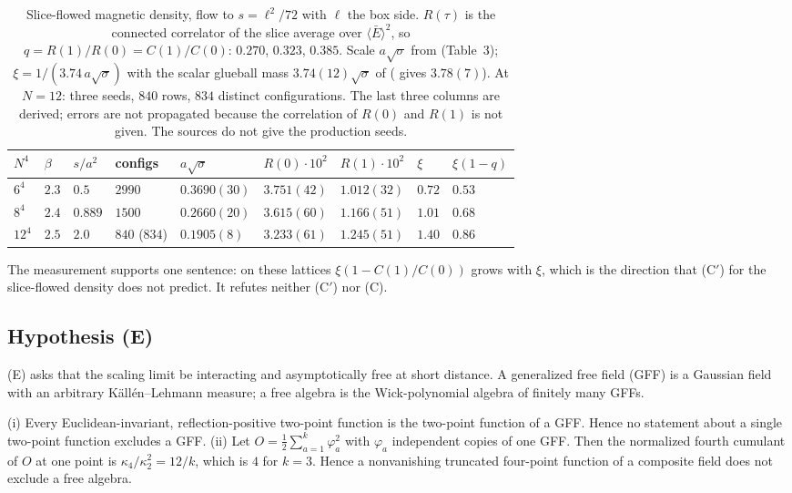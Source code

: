 \begin{table}[ht]
\centering
\small
\begin{tabular}{@{}lllllllll@{}}
\toprule
$N^4$ & $\beta$ & $s/a^2$ & configs & $a\sqrt\sigma$ & $R(0)\cdot10^2$ & $R(1)\cdot10^2$ & $\xi$ & $\xi(1-q)$ \\
\midrule
$6^4$ & $2.3$ & $0.5$ & $2990$ & $0.3690(30)$ & $3.751(42)$ & $1.012(32)$ & $0.72$ & $0.53$ \\
$8^4$ & $2.4$ & $0.889$ & $1500$ & $0.2660(20)$ & $3.615(60)$ & $1.166(51)$ & $1.01$ & $0.68$ \\
$12^4$ & $2.5$ & $2.0$ & $840$ ($834$) & $0.1905(8)$ & $3.233(61)$ & $1.245(51)$ & $1.40$ & $0.86$ \\
\bottomrule
\end{tabular}
\caption{Slice-flowed magnetic density, flow to $s=\ell^2/72$ with $\ell$ the box side.
$R(\tau)$ is the connected correlator of the slice average over $\langle\bar E\rangle^2$, so
$q=R(1)/R(0)=C(1)/C(0)$: $0.270$, $0.323$, $0.385$. Scale $a\sqrt\sigma$ from \cite{FHK93}
(Table~3); $\xi=1/(3.74\,a\sqrt\sigma)$ with the scalar glueball mass $3.74(12)\sqrt\sigma$ of
\cite{Te98} (\cite{LTW04} gives $3.78(7)$). At $N=12$: three seeds, $840$ rows, $834$ distinct
configurations. The last three columns are derived; errors are not propagated because the
correlation of $R(0)$ and $R(1)$ is not given. The sources do not give the production seeds.}
\label{neg:tab-matched}
\end{table}

The measurement supports one sentence: on these lattices $\xi(1-C(1)/C(0))$ grows with $\xi$,
which is the direction that (C$'$) for the slice-flowed density does not predict. It refutes
neither (C$'$) nor (C).

\subsection{Hypothesis (E)}

(E) asks that the scaling limit be interacting and asymptotically free at short distance. A
generalized free field (GFF) is a Gaussian field with an arbitrary K\"all\'en--Lehmann measure;
a free algebra is the Wick-polynomial algebra of finitely many GFFs.

\begin{proposition}\label{neg:prop-GFF}
\textup{(i)} Every Euclidean-invariant, reflection-positive two-point function is the two-point
function of a GFF. Hence no statement about a single two-point function excludes a GFF.
\textup{(ii)} Let $O=\frac12\sum_{a=1}^k\varphi_a^2$ with $\varphi_a$ independent copies of one
GFF. Then the normalized fourth cumulant of $O$ at one point is $\kappa_4/\kappa_2^2=12/k$, which
is $4$ for $k=3$. Hence a nonvanishing truncated four-point function of a composite field does
not exclude a free algebra.
\end{proposition}

